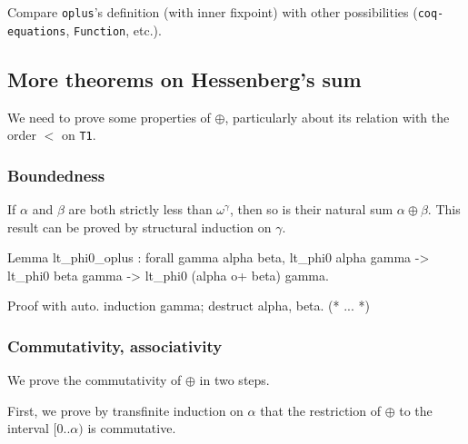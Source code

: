 \documentclass[a4paper]{book}
\begin{document}



\begin{project}
Compare \texttt{oplus}'s definition (with inner fixpoint) with other possibilities
(\texttt{coq-equations}, \texttt{Function}, etc.).
\end{project}
\subsection{More theorems on Hessenberg's sum}

We need to prove some properties of $\oplus$, particularly about 
its relation with the order $<$ on \texttt{T1}.

\subsubsection{Boundedness}
If $\alpha$ and $\beta$ are both strictly  less than  $\omega^\gamma$, then so is their natural sum
$\alpha \oplus \beta$. This result can be proved by structural induction on $\gamma$.


\begin{Coqsrc}
Lemma lt_phi0_oplus : forall gamma alpha beta,
                        lt_phi0 alpha gamma ->
                        lt_phi0 beta gamma ->
                        lt_phi0 (alpha o+ beta) gamma.

Proof with auto.
  induction gamma; destruct alpha, beta.  
(* ... *)
\end{Coqsrc}

\subsubsection{Commutativity, associativity}

We prove  the commutativity of $\oplus$ in two steps. 

First, we prove by transfinite induction on $\alpha$ that the restriction of $\oplus$ to the
interval $[0..\alpha)$ is commutative.

\end{document}
